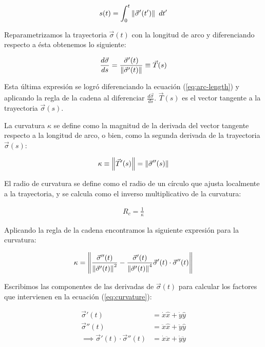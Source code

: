\begin{align}
  s(t) = \int^t_0 \left\lVert\vec{\sigma}'(t')\right\rVert~dt' \label{eq:arc-length}
\end{align}

Reparametrizamos la trayectoria $\vec{\sigma}(t)$ con la longitud de arco y diferenciando respecto a ésta obtenemos lo siguiente:

\begin{align}
  \frac{d\vec{\sigma}}{ds} = \frac{\vec{\sigma}'(t)}{\left\lVert\vec{\sigma}'(t)\right\rVert} \equiv \vec{T}(s)
\end{align}

Esta última expresión se logró diferenciando la ecuación (\ref{eq:arc-length}) y aplicando la regla de la cadena al diferenciar $\frac{d\vec{\sigma}}{ds}$. $\vec{T}(s)$ es el vector tangente a la trayectoria $\vec{\sigma}(s)$.

La curvatura $\kappa$ se define como la magnitud de la derivada del vector tangente respecto a la longitud de arco, o bien, como la segunda derivada de la trayectoria $\vec{\sigma}(s)$:

\begin{align}
  \kappa \equiv \left\lVert\vec{T}'(s)\right\rVert = \left\lVert\vec{\sigma}''(s)\right\rVert 
\end{align}

El radio de curvatura se define como el radio de un círculo que ajusta localmente a la trayectoria, y se calcula como el inverso
multiplicativo de la curvatura:

\begin{align}
  R_c = \frac{1}{\kappa}
\end{align}

Aplicando la regla de la cadena encontramos la siguiente expresión para la curvatura:

\begin{align}
  \kappa = \left\lVert\frac{\vec{\sigma}''(t)}{\left\lVert\vec{\sigma}'(t)\right\rVert^2} - \frac{\vec{\sigma}'(t)}{\left\lVert\vec{\sigma}'(t)\right\rVert^4}
  \vec{\sigma}'(t)\cdot\vec{\sigma}''(t)\right\rVert \label{eq:curvature}
\end{align}

Escribimos las componentes de las derivadas de $\vec{\sigma}(t)$ para calcular los factores que intervienen en la
ecuación (\ref{eq:curvature}):

\begin{align} 
  \vec{\sigma}'(t) &= \dot{x}\hat{x} + \dot{y} \hat{y} \\
  \vec{\sigma}''(t) &= \ddot{x} \hat{x} +  \ddot{y} \hat{y} \\
  \implies \vec{\sigma}'(t)\cdot\vec{\sigma}''(t) &= \dot{x}\ddot{x} + \dot{y}\ddot{y}
\end{align}


